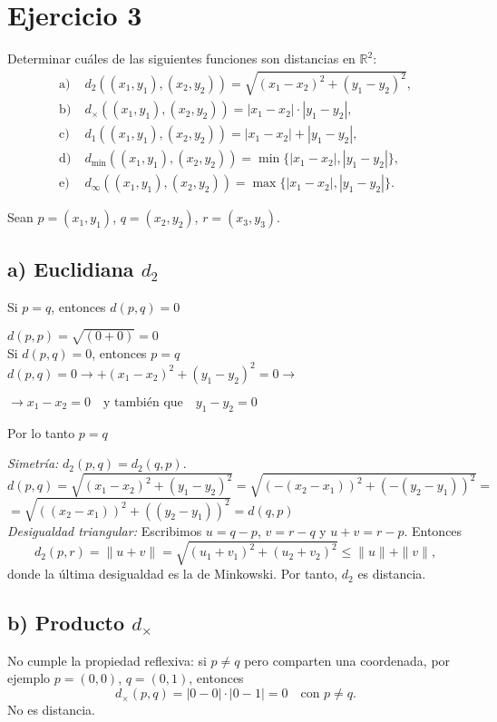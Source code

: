 \documentclass[12pt]{article}
\begin{document}
\section*{Ejercicio 3}
Determinar cuáles de las siguientes funciones son distancias en $\mathbb{R}^2$:
\[
\begin{aligned}
\text{a)}\;& d_2((x_1,y_1),(x_2,y_2))=\sqrt{(x_1-x_2)^2+(y_1-y_2)^2},\\
\text{b)}\;& d_\times((x_1,y_1),(x_2,y_2))=|x_1-x_2|\cdot|y_1-y_2|,\\
\text{c)}\;& d_1((x_1,y_1),(x_2,y_2))=|x_1-x_2|+|y_1-y_2|,\\
\text{d)}\;& d_{\min}((x_1,y_1),(x_2,y_2))=\min\{|x_1-x_2|,|y_1-y_2|\},\\
\text{e)}\;& d_\infty((x_1,y_1),(x_2,y_2))=\max\{|x_1-x_2|,|y_1-y_2|\}.
\end{aligned}
\]

Sean $p=(x_1,y_1)$, $q=(x_2,y_2)$, $r=(x_3,y_3)$.

\subsection*{a) Euclidiana $d_2$}
Si $p=q$, entonces $d(p,q)=0$ 

$d(p,p) = \sqrt{(0 + 0)} = 0$ \\

Si $d(p,q) = 0$, entonces $p=q$
$d(p,q)= 0 \rightarrow + (x_1-x_2)^2+(y_1-y_2)^2 = 0 \rightarrow $

$\rightarrow x_1 - x_2 = 0 \quad \text{y también que} \quad y_1 - y_2 = 0$

Por lo tanto $p=q$

\emph{Simetría:} $d_2(p,q)=d_2(q,p)$. \\

$d(p,q)=\sqrt{(x_1-x_2)^2+(y_1-y_2)^2} = \sqrt{(-(x_2-x_1))^2+(-(y_2-y_1))^2} = $ \\

$ = \sqrt{((x_2-x_1))^2+((y_2-y_1))^2} = d(q,p)$ \\

\emph{Desigualdad triangular:} Escribimos $u=q-p$, $v=r-q$ y $u+v=r-p$. Entonces
\[
d_2(p,r)=\|u+v\|
=\sqrt{(u_1+v_1)^2+(u_2+v_2)^2}
\le \|u\|+\|v\|,
\]
donde la última desigualdad es la de Minkowski. Por tanto, $d_2$ es distancia.

\subsection*{b) Producto $d_\times$}
No cumple la propiedad reflexiva: si $p\neq q$ pero comparten una coordenada, por ejemplo $p=(0,0)$, $q=(0,1)$, entonces
\[
d_\times(p,q)=|0-0|\cdot|0-1|=0\quad\text{con }p\neq q.
\]
No es distancia.
\end{document}
